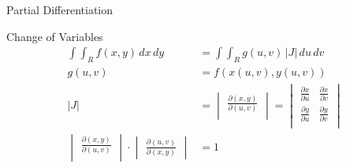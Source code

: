 \begin{section}{Partial Differentiation}
  \begin{section}{Change of Variables}
    \begin{align*}
      \int\int_R{f(x,y) \,dx \,dy} &=\int\int_R{g(u,v)\, |J| \,du \,dv} \\
      g(u,v) &= f(x(u,v),y(u,v)) \\
      |J| &=
            \begin{vmatrix}
              \frac{\partial{(x,y)}}{\partial{(u,v)}}\\
            \end{vmatrix} =
      \begin{vmatrix}
        \frac{\partial{x}}{\partial{u}} & \frac{\partial{x}}{\partial{v}}\\
        \frac{\partial{y}}{\partial{u}} & \frac{\partial{y}}{\partial{v}}\\
      \end{vmatrix} \\
      \begin{vmatrix}
        \frac{\partial{(x,y)}}{\partial{(u,v)}}\\
      \end{vmatrix}
      \cdot
      \begin{vmatrix}
        \frac{\partial{(u,v)}}{\partial{(x,y)}}
      \end{vmatrix}
      &= 1
    \end{align*}
  \end{section}


\end{section}
